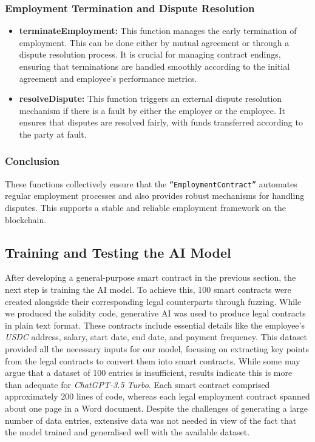 \subsubsection{Employment Termination and Dispute Resolution}

\begin{itemize}
    \item \textbf{terminateEmployment:} This function manages the early termination of employment. This can be done either by mutual agreement or through a dispute resolution process. It is crucial for managing contract endings, ensuring that terminations are handled smoothly according to the initial agreement and employee's performance metrics.
    \item \textbf{resolveDispute:} This function triggers an external dispute resolution mechanism if there is a fault by either the employer or the employee. It ensures that disputes are resolved fairly, with funds transferred according to the party at fault. 
\end{itemize}

\subsubsection{Conclusion}

These functions collectively ensure that the \texttt{``EmploymentContract''} automates regular employment processes and also provides robust mechanisms for handling disputes. This supports a stable and reliable employment framework on the blockchain.

\subsection{Training and Testing the AI Model}

After developing a general-purpose smart contract in the previous section, the next step is training the AI model. To achieve this, 100 smart contracts were created alongside their corresponding legal counterparts through fuzzing. While we produced the solidity code, generative AI was used to produce legal contracts in plain text format.
These contracts include essential details like the employee's \textit{USDC} address, salary, start date, end date, and payment frequency. This dataset provided all the necessary inputs for our model, focusing on extracting key points from the legal contracts to convert them into smart contracts. While some may argue that a dataset of 100 entries is insufficient, results indicate this is more than adequate for \textit{ChatGPT-3.5 Turbo}. Each smart contract comprised approximately 200 lines of code, whereas each legal employment contract spanned about one page in a Word document. Despite the challenges of generating a large number of data entries, extensive data was not needed in view of the fact that the model trained and generalised well with the available dataset.

